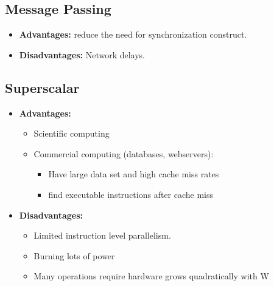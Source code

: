 \documentclass[../main.tex]{subfiles}
\begin{document}
\subsection{Message Passing}

\begin{itemize}
	\item \textbf{Advantages:} reduce the need for synchronization construct.
	\item \textbf{Disadvantages:} Network delays.
\end{itemize}

\subsection{Superscalar}

\begin{itemize}
	\item \textbf{Advantages:}
	      \begin{itemize}
		      \item Scientific computing
		      \item Commercial computing (databases, webservers):
		            \begin{itemize}
			            \item Have large data set and  high cache miss rates
			            \item find executable instructions after cache miss
		            \end{itemize}
	      \end{itemize}
	\item \textbf{Disadvantages:}
	      \begin{itemize}
		      \item Limited instruction level parallelism.
		      \item Burning lots of power
		      \item Many operations require hardware grows quadratically with W
	      \end{itemize}
\end{itemize}
\end{document}
